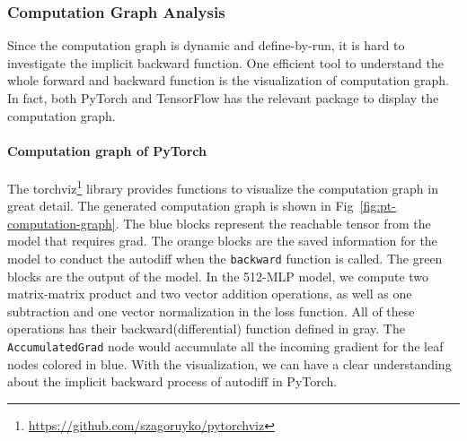 \documentclass[12pt,twocolumn,letterpaper]{extarticle}
\begin{document}
\subsubsection{Computation Graph Analysis}

Since the computation graph is dynamic and define-by-run, it is hard to investigate the implicit backward function. One efficient tool to understand the whole forward and backward function is the visualization of computation graph. In fact, both PyTorch and TensorFlow has the relevant package to display the computation graph.

\paragraph{Computation graph of PyTorch}

The torchviz\footnote{\url{https://github.com/szagoruyko/pytorchviz}} library provides functions to visualize the computation graph in great detail. The generated computation graph is shown in Fig~\ref{fig:pt-computation-graph}. The blue blocks represent the reachable tensor from the model that requires grad. The orange blocks are the saved information for the model to conduct the autodiff when the \texttt{backward} function is called. The green blocks are the output of the model. In the 512-MLP model, we compute two matrix-matrix product and two vector addition operations, as well as one subtraction and one vector normalization in the loss function. All of these operations has their backward\;(differential) function defined in gray. The \texttt{AccumulatedGrad} node would accumulate all the incoming gradient for the leaf nodes colored in blue. With the visualization, we can have a clear understanding about the implicit backward process of autodiff in PyTorch.
\end{document}
